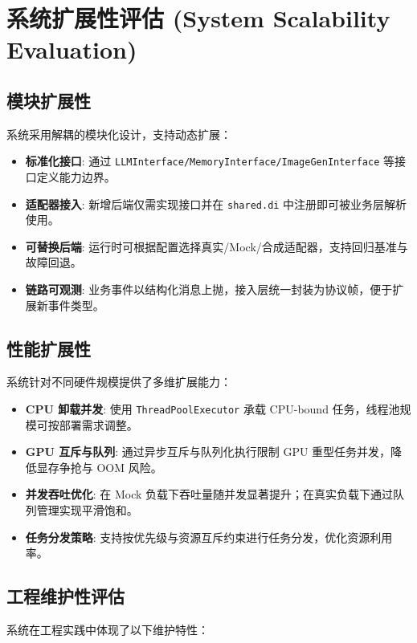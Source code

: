 \documentclass[a4paper,12pt]{article}
\begin{document}
\section{系统扩展性评估 (System Scalability Evaluation)}

\subsection{模块扩展性}

系统采用解耦的模块化设计，支持动态扩展：

\begin{itemize}
    \item \textbf{标准化接口}: 通过 \texttt{LLMInterface/MemoryInterface/ImageGenInterface} 等接口定义能力边界。
    \item \textbf{适配器接入}: 新增后端仅需实现接口并在 \texttt{shared.di} 中注册即可被业务层解析使用。
    \item \textbf{可替换后端}: 运行时可根据配置选择真实/Mock/合成适配器，支持回归基准与故障回退。
    \item \textbf{链路可观测}: 业务事件以结构化消息上抛，接入层统一封装为协议帧，便于扩展新事件类型。
\end{itemize}

\subsection{性能扩展性}

系统针对不同硬件规模提供了多维扩展能力：

\begin{itemize}
    \item \textbf{CPU 卸载并发}: 使用 \texttt{ThreadPoolExecutor} 承载 CPU-bound 任务，线程池规模可按部署需求调整。
    \item \textbf{GPU 互斥与队列}: 通过异步互斥与队列化执行限制 GPU 重型任务并发，降低显存争抢与 OOM 风险。
    \item \textbf{并发吞吐优化}: 在 Mock 负载下吞吐量随并发显著提升；在真实负载下通过队列管理实现平滑饱和。
    \item \textbf{任务分发策略}: 支持按优先级与资源互斥约束进行任务分发，优化资源利用率。
\end{itemize}

\subsection{工程维护性评估}

系统在工程实践中体现了以下维护特性：
\end{document}
